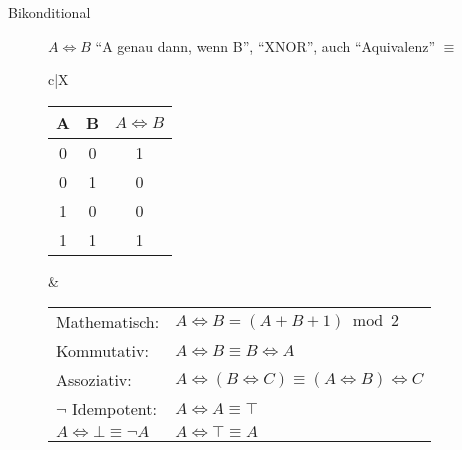 \begin{description}
\begin{description}
        \item[Bikonditional] $A \Leftrightarrow B$ ``A genau dann, wenn B'', ``XNOR'', auch ``Aquivalenz'' $\equiv$ \\
        \begin{tabularx}{\linewidth}{c|X}
            \begin{tabular}[t]{c | c || c}
                A & B & $A \Leftrightarrow B$ \\ \hline\hline
                0 & 0 & 1                     \\ \hline
                0 & 1 & 0                     \\ \hline
                1 & 0 & 0                     \\ \hline
                1 & 1 & 1
            \end{tabular} &
            \begin{tabular}[t]{ll}
                Mathematisch:                          & $A \Leftrightarrow B = (A + B + 1)\bmod 2$                                               \\
                Kommutativ:                            & $A \Leftrightarrow B \equiv B \Leftrightarrow A$                                         \\
                Assoziativ:                            & $A \Leftrightarrow (B \Leftrightarrow C) \equiv (A \Leftrightarrow B) \Leftrightarrow C$ \\
                $\neg$ Idempotent:                     & $A \Leftrightarrow A \equiv \top$                                                        \\
                $A \Leftrightarrow \bot \equiv \neg A$ & $A \Leftrightarrow \top \equiv A$
            \end{tabular} \\ \hline
        \end{tabularx}
    \end{description}
\end{description}
